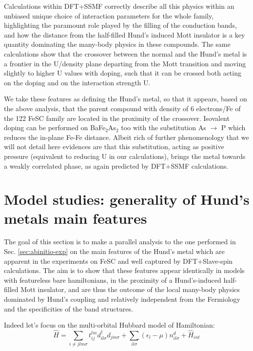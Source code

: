 \documentclass[12pt,twoside]{article}
\def\be{\begin{equation}}
\def\ee{\end{equation}}
\def\eps{\epsilon}
\def\s{\sigma}
\begin{document}
Calculations within DFT+SSMF correctly describe all this physics within an unbiased unique choice of interaction parameters for the whole family, highlighting the paramount role played by the filling of the conduction bands, and how the distance from the half-filled Hund's induced Mott insulator is a key quantity dominating the many-body physics in these compounds. The same calculations show that the crossover between the normal and the Hund's metal is a frontier in the U/density plane departing from the Mott transition and moving slightly to higher U values with doping, such that it can be crossed both acting on the doping and on the interaction strength U.

We take these features as defining the Hund's metal, so that it appears, based on the above analysis, that the parent compound with density of 6 electrons/Fe of the 122 FeSC family are located in the proximity of the crossover. Isovalent doping\cite{PaglioneGreene_NatRev} can be performed on BaFe$_2$As$_2$ too with the substitution As $\rightarrow$ P which reduces the in-plane Fe-Fe distance. Albeit rich of further phenomenology that we will not detail here evidences are that this substitution, acting as positive pressure (equivalent to reducing U in our calculations), brings the metal towards a weakly correlated phase, as again predicted by DFT+SSMF calculations. 


\section{Model studies: generality of Hund's metals main features}\label{sec:models}

The goal of this section is to make a parallel analysis to the one performed in Sec. \ref{sec:abinitio-exp} on the main features of the Hund's metal which are apparent in the experiments on FeSC and well captured by DFT+Slave-spin calculations.
The aim is to show that these features appear identically in models with featureless bare hamiltonians, in the proximity of a Hund's-induced half-filled Mott insulator, and are thus the outcome of the local many-body physics dominated by Hund's coupling and relatively independent from the Fermiology and the specificities of the band structures. 

Indeed let's focus on the multi-orbital Hubbard model of Hamiltonian:
\be\label{eq:multiorb_Hubbard}
\hat H = \sum_{i\neq j lm\s} t^{l m}_{ij} d^\dag_{il\s}d_{jm\s}+\sum_{il\s}(\eps_l-\mu)n^d_{il\s}+\hat {H}_{int}
\ee
\end{document}
